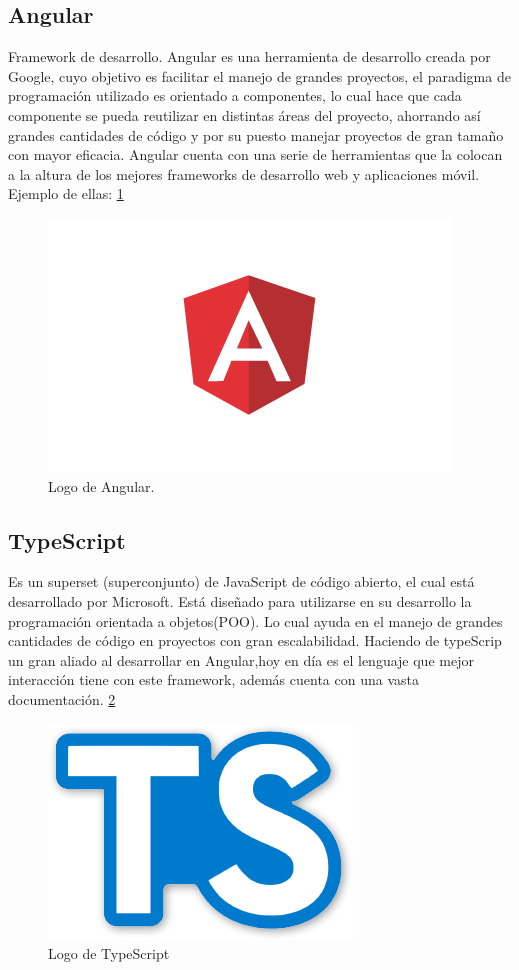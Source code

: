 \subsection{Angular}
Framework de desarrollo.
Angular es una herramienta de desarrollo creada por Google, cuyo objetivo es facilitar el manejo de grandes proyectos, el paradigma de programación utilizado es orientado a componentes, lo cual hace que cada componente se pueda reutilizar en distintas áreas del proyecto, ahorrando así grandes cantidades de código y por su puesto manejar proyectos de gran tamaño con mayor eficacia. Angular cuenta con una serie de herramientas que la colocan a la altura de los mejores frameworks de desarrollo web y aplicaciones móvil.  Ejemplo de ellas: \cite{Angular} \ref{figura9}
\begin{figure}[h]
  \label{figura9}
  \centering
  \includegraphics[scale=.70]{lib/assets/9}
  \caption{Logo de Angular.}
\end{figure}

\subsection{TypeScript}
Es un superset (superconjunto) de JavaScript de código abierto, el cual está desarrollado por Microsoft. Está diseñado para utilizarse en su desarrollo la programación orientada a objetos(POO). Lo cual ayuda en el manejo de grandes cantidades de código en proyectos con gran escalabilidad. Haciendo de typeScrip un gran aliado al desarrollar en Angular,hoy en día es el lenguaje que mejor interacción tiene con este framework, además cuenta con una vasta documentación. \cite{typeScript} \ref{figura10}
\begin{figure}[h]
  \label{figura10}
  \centering
  \includegraphics[scale=.35]{lib/assets/10}
  \caption{Logo de TypeScript}
\end{figure}



